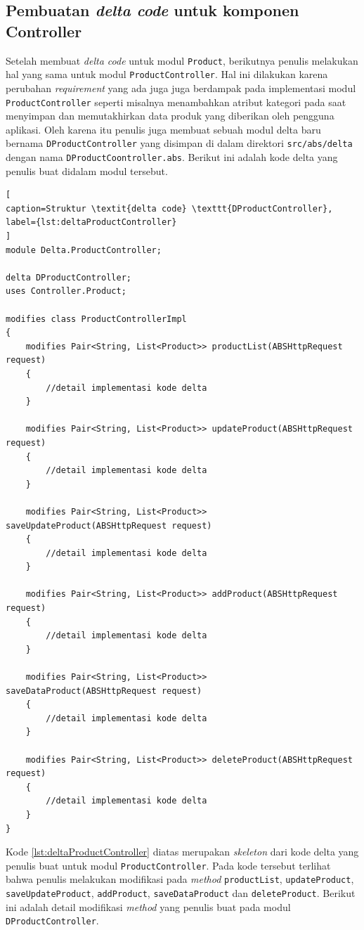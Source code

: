 \subsection{Pembuatan \textit{delta code} untuk komponen Controller}

Setelah membuat \textit{delta code} untuk modul \texttt{Product}, berikutnya penulis melakukan hal yang sama untuk modul \texttt{ProductController}. Hal ini dilakukan karena perubahan \textit{requirement} yang ada juga juga berdampak pada implementasi modul \texttt{ProductController} seperti misalnya menambahkan atribut kategori pada saat menyimpan dan memutakhirkan data produk yang diberikan oleh pengguna aplikasi. Oleh karena itu penulis juga membuat sebuah modul delta baru bernama \texttt{DProductController} yang disimpan di dalam direktori \texttt{src/abs/delta} dengan nama \texttt{DProductCoontroller.abs}. Berikut ini adalah kode delta yang penulis buat didalam modul tersebut.

\begin{lstlisting}[
caption=Struktur \textit{delta code} \texttt{DProductController},
label={lst:deltaProductController}
]
module Delta.ProductController;

delta DProductController;
uses Controller.Product;

modifies class ProductControllerImpl
{
	modifies Pair<String, List<Product>> productList(ABSHttpRequest request)
	{
		//detail implementasi kode delta
	}
	
	modifies Pair<String, List<Product>> updateProduct(ABSHttpRequest request)
	{
	    //detail implementasi kode delta	
	}
	
	modifies Pair<String, List<Product>> saveUpdateProduct(ABSHttpRequest request)
	{
		//detail implementasi kode delta
	}
	
	modifies Pair<String, List<Product>> addProduct(ABSHttpRequest request)
	{	
		//detail implementasi kode delta
	}
	
	modifies Pair<String, List<Product>> saveDataProduct(ABSHttpRequest request)
	{
		//detail implementasi kode delta
	}
	
	modifies Pair<String, List<Product>> deleteProduct(ABSHttpRequest request)
	{
		//detail implementasi kode delta
	}
}
\end{lstlisting}

Kode \ref{lst:deltaProductController} diatas merupakan \textit{skeleton} dari kode delta yang penulis buat untuk modul \texttt{ProductController}. Pada kode tersebut terlihat bahwa penulis melakukan modifikasi pada \textit{method} \texttt{productList}, \texttt{updateProduct}, \texttt{saveUpdateProduct}, \texttt{addProduct}, \texttt{saveDataProduct} dan \texttt{deleteProduct}. Berikut ini adalah detail modifikasi \textit{method} yang penulis buat pada modul \texttt{DProductController}.

